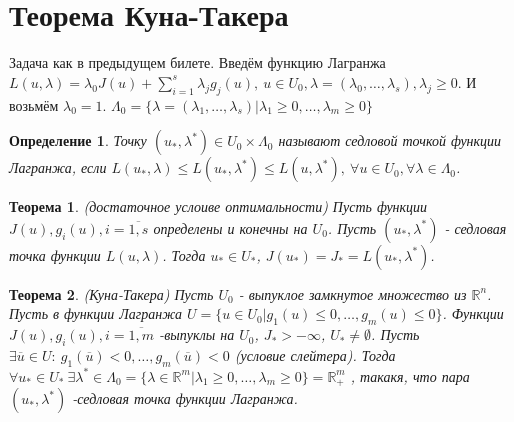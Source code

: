 \documentclass[9pt, a4paper]{extarticle}
\newtheorem*{theorem}{Теорема}
\newtheorem*{definition}{Определение}
\begin{document}
\section{Теорема Куна-Такера}
	Задача как в предыдущем билете. \newline
		Введём функцию Лагранжа $L(u, \lambda) = \lambda_0 J(u) + \sum\limits_{i=1}^s \lambda_j g_j(u), \ u \in U_0, \lambda = (\lambda_0, \dots, \lambda_s), \lambda_j \geq 0$. И возьмём $\lambda_0 = 1$.  \newline
		$\Lambda_0 = \{\lambda = (\lambda_1, \dots, \lambda_s) \vert \lambda_1 \geq 0, \dots , \lambda_m \geq 0\}$
	\begin{definition}
		Точку $(u_*, \lambda^*) \in U_0 \times \Lambda_0$ называют седловой точкой функции Лагранжа, если $L(u_*, \lambda) \leq L(u_*, \lambda^*) \leq L(u, \lambda^*), \ \forall u \in U_0, \forall \lambda \in \Lambda_0$.
	\end{definition}
	\begin{theorem}
		(достаточное услоиве оптимальности)\newline
		Пусть функции $J(u), g_i(u), i=\overline{1,s}$ определены и конечны на $U_0$. Пусть $(u_*, \lambda^*)$ - седловая точка функции $L(u, \lambda)$. Тогда $u_* \in U_*$, $J(u_*) = J_* = L(u_*, \lambda^*)$.	
	\end{theorem}
	\begin{theorem}
		(Куна-Такера)\newline
		Пусть $U_0$ - выпуклое замкнутое множество из $\mathbb{R}^n$. Пусть в функции Лагранжа $U = \{u\in U_0 \vert g_1(u) \leq 0, \dots , g_m(u) \leq 0\}$. Функции $J(u), g_i(u), i = \overline{1,m}$ -выпуклы на $U_0$, $J_* > -\infty$, $U_* \neq \emptyset$. Пусть $\exists \overline{u} \in U: \ g_1(\overline{u}) < 0, \dots, g_m(\overline{u}) < 0$ (условие слейтера). Тогда $\forall u_* \in U_* \ \exists \lambda^* \in \Lambda_0 = \{\lambda \in \mathbb{R}^m \vert \lambda_1 \geq 0, \dots, \lambda_m \geq 0\} = \mathbb{R}_+^m$ , такакя, что пара $(u_*, \lambda^*)$ -седловая точка функции Лагранжа.
	\end{theorem}
\end{document}
